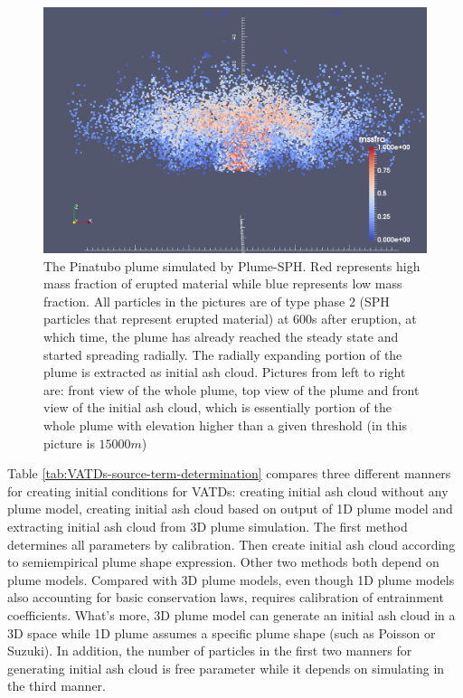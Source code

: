 \begin{figure}[!htb]
\begin{minipage}{.325 \textwidth}
    \end{minipage}%
    \begin{minipage}{.325 \textwidth}
        \centering
        \includegraphics[width=0.99 \textwidth]{Chapter-7/Figures/mssfrc_front-z15000}
    \end{minipage}%
    \caption{The Pinatubo plume simulated by Plume-SPH. Red represents high mass fraction of erupted material while blue represents low mass fraction. All particles in the pictures are of type phase 2 (SPH particles that represent erupted material) at 600s after eruption, at which time, the plume has already reached the steady state and started spreading radially. The radially expanding portion of the plume is extracted as initial ash cloud. Pictures from left to right are: front view of the whole plume, top view of the plume and front view of the initial ash cloud, which is essentially portion of the whole plume with elevation higher than a given threshold (in this picture is $15000 m$)}
    \label{fig:Plume-SPH-Pinatubo-ash-cloud}
\end{figure}

Table \ref{tab:VATDs-source-term-determination} compares three different manners for creating initial conditions for VATDs: creating initial ash cloud without any plume model, creating initial ash cloud based on output of 1D plume model and extracting initial ash cloud from 3D plume simulation. The first method determines all parameters by calibration. Then create initial ash cloud according to semiempirical plume shape expression. Other two methods both depend on plume models. Compared with 3D plume models, even though 1D plume models also accounting for basic conservation laws, requires calibration of entrainment coefficients. What's more, 3D plume model can generate an initial ash cloud in a 3D space while 1D plume assumes a specific plume shape (such as Poisson or Suzuki). In addition, the number of particles in the first two manners for generating initial ash cloud is free parameter while it depends on simulating in the third manner. 

